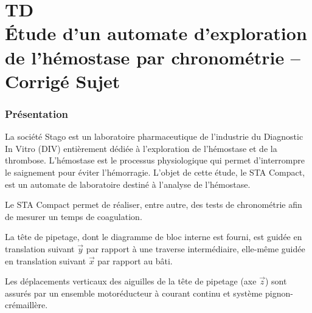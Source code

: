 \chapter*{TD  \\ 
Étude d'un automate d'exploration de l'hémostase par chronométrie -- 
\ifprof Corrigé \else Sujet \fi}

\iflivret {} \else
\ifprof  {} \else \fi
\fi

\setcounter{question}{0}



\subsection*{Présentation}

La société Stago est un laboratoire pharmaceutique de l'industrie du Diagnostic In Vitro (DIV) entièrement dédiée à l'exploration de l'hémostase et de la thrombose. L'hémostase est le processus physiologique qui permet d'interrompre le saignement pour éviter l'hémorragie. L'objet de cette étude, le STA Compact, est un automate de laboratoire destiné à l'analyse de l'hémostase.

Le STA Compact permet de réaliser, entre autre, des tests de chronométrie afin de mesurer un
temps de coagulation. 


La tête de pipetage, dont le diagramme de bloc interne est fourni, est guidée en
translation suivant $\overrightarrow{y}$ par rapport à une traverse intermédiaire, elle-même guidée en translation
suivant $\overrightarrow{x}$ par rapport au bâti. 

Les déplacements verticaux des aiguilles de la tête de pipetage (axe $\overrightarrow{z}$) sont assurés par un ensemble
motoréducteur à courant continu et système pignon-crémaillère.




